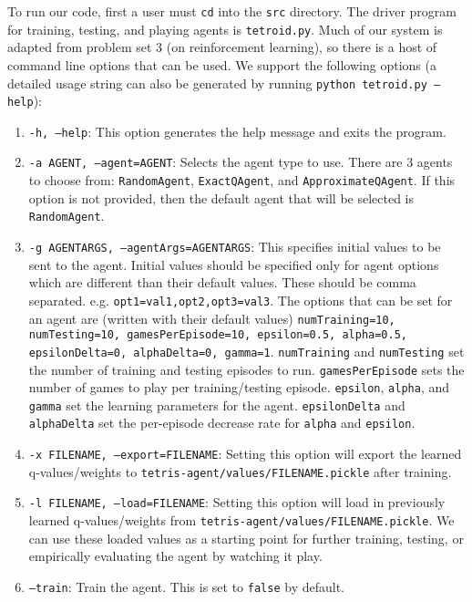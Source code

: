 \documentclass[10pt]{article}
\begin{document}
\bigskip

To run our code, first a user must \texttt{cd} into the \texttt{src} directory. The driver program for training, testing, and playing agents is \texttt{tetroid.py}. Much of our system is adapted from problem set 3 (on reinforcement learning), so there is a host of command line options that can be used. We support the following options (a detailed usage string can also be generated by running \texttt{python tetroid.py --help}):
\begin{enumerate}
    \item \texttt{-h, --help}: This option generates the help message and exits the program.
    \item \texttt{-a AGENT, --agent=AGENT}: Selects the agent type to use. There are 3 agents to choose from: \texttt{RandomAgent}, \texttt{ExactQAgent}, and \texttt{ApproximateQAgent}. If this option is not provided, then the default agent that will be selected is \texttt{RandomAgent}.
    \item \texttt{-g AGENTARGS, --agentArgs=AGENTARGS}: This specifies initial values to be sent to the agent. Initial values should be specified only for agent options which are different than their default values. These should be comma separated. e.g. \texttt{opt1=val1,opt2,opt3=val3}. The options that can be set for an agent are (written with their default values) \texttt{numTraining=10, numTesting=10, gamesPerEpisode=10, epsilon=0.5, alpha=0.5, epsilonDelta=0, alphaDelta=0, gamma=1}. \texttt{numTraining} and \texttt{numTesting} set the number of training and testing episodes to run. \texttt{gamesPerEpisode} sets the number of games to play per training/testing episode. \texttt{epsilon}, \texttt{alpha}, and \texttt{gamma} set the learning parameters for the agent. \texttt{epsilonDelta} and \texttt{alphaDelta} set the per-episode decrease rate for \texttt{alpha} and \texttt{epsilon}.
    \item \texttt{-x FILENAME, --export=FILENAME}: Setting this option will export the learned q-values/weights to \texttt{tetris-agent/values/FILENAME.pickle} after training.
    \item \texttt{-l FILENAME, --load=FILENAME}: Setting this option will load in previously learned q-values/weights from \texttt{tetris-agent/values/FILENAME.pickle}. We can use these loaded values as a starting point for further training, testing, or empirically evaluating the agent by watching it play.
    \item \texttt{--train}: Train the agent. This is set to \texttt{false} by default.

\end{enumerate}
\end{document}
